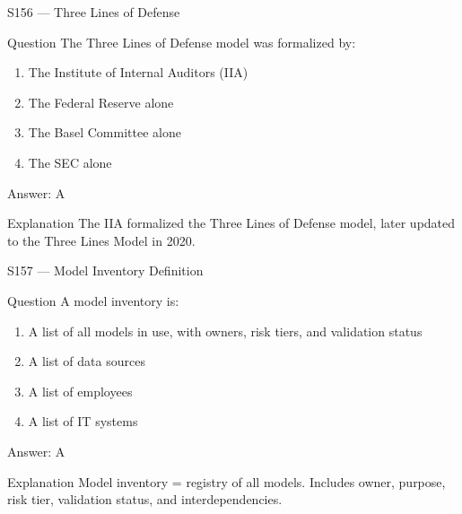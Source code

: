 \documentclass[aspectratio=169,8pt]{beamer}
\begin{document}
	\begin{frame}{S156 --- Three Lines of Defense}
		\begin{block}{Question}
			The Three Lines of Defense model was formalized by:
			\begin{enumerate}
				\item The Institute of Internal Auditors (IIA)
				\item The Federal Reserve alone
				\item The Basel Committee alone
				\item The SEC alone
			\end{enumerate}
		\end{block}
		\begin{exampleblock}{Answer: A}\end{exampleblock}
		\begin{block}{Explanation}
			The IIA formalized the Three Lines of Defense model, later updated to the Three Lines Model in 2020.
		\end{block}
	\end{frame}
	
	\begin{frame}{S157 --- Model Inventory Definition}
		\begin{block}{Question}
			A model inventory is:
			\begin{enumerate}
				\item A list of all models in use, with owners, risk tiers, and validation status
				\item A list of data sources
				\item A list of employees
				\item A list of IT systems
			\end{enumerate}
		\end{block}
		\begin{exampleblock}{Answer: A}\end{exampleblock}
		\begin{block}{Explanation}
			Model inventory = registry of all models. Includes owner, purpose, risk tier, validation status, and interdependencies.
		\end{block}
	\end{frame}
	
\end{document}
